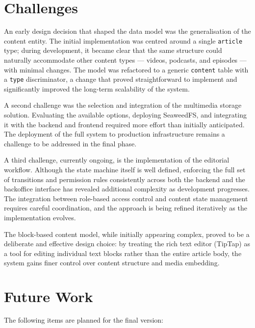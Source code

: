 \section{Challenges} \label{sec:conc_challenges}

An early design decision that shaped the data model was the generalisation of the
content entity. The initial implementation was centred around a single
\texttt{article} type; during development, it became clear that the same structure
could naturally accommodate other content types --- videos, podcasts, and episodes
--- with minimal changes. The model was refactored to a generic \texttt{content}
table with a \texttt{type} discriminator, a change that proved straightforward to
implement and significantly improved the long-term scalability of the system.

A second challenge was the selection and integration of the multimedia storage
solution. Evaluating the available options, deploying SeaweedFS, and integrating
it with the backend and frontend required more effort than initially anticipated.
The deployment of the full system to production infrastructure remains a challenge
to be addressed in the final phase.

A third challenge, currently ongoing, is the implementation of the editorial
workflow. Although the state machine itself is well defined, enforcing the full
set of transitions and permission rules consistently across both the backend and
the backoffice interface has revealed additional complexity as development
progresses. The integration between role-based access control and content state
management requires careful coordination, and the approach is being refined
iteratively as the implementation evolves.

The block-based content model, while initially appearing complex, proved to be a
deliberate and effective design choice: by treating the rich text editor (TipTap)
as a tool for editing individual text blocks rather than the entire article body,
the system gains finer control over content structure and media embedding.

\section{Future Work} \label{sec:conc_future}

The following items are planned for the final version:

